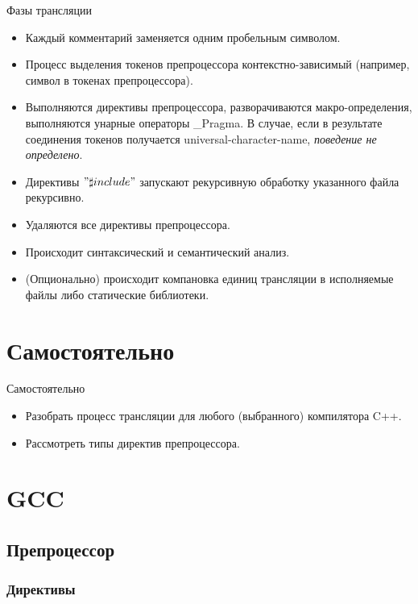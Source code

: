 


    
    \begin{frame}{Фазы трансляции}
        \begin{itemize}
            \item Каждый комментарий заменяется одним пробельным символом.
            \item Процесс выделения токенов препроцессора контекстно-зависимый (например, символ в токенах препроцессора).
            \item Выполняются директивы препроцессора, разворачиваются макро-определения, выполняются унарные операторы \_Pragma.
                В случае, если в результате соединения токенов получается universal-character-name, \textit{поведение не определено}.
            \item Директивы $"\sharp{include}"$ запускают рекурсивную обработку указанного файла рекурсивно.
            \item Удаляются все директивы препроцессора.
            \item Происходит синтаксический и семантический анализ.
            \item (Опционально) происходит компановка единиц трансляции в исполняемые файлы либо статические библиотеки.
        \end{itemize}
    \end{frame}
    \section{Самостоятельно}
    \begin{frame}{Самостоятельно}
        \begin{itemize}
            \item Разобрать процесс трансляции для любого (выбранного) компилятора C++.
            \item Рассмотреть типы директив препроцессора.
        \end{itemize}
    \end{frame}
    \section{GCC}
    \subsection{Препроцессор}
    \subsubsection{Директивы}
